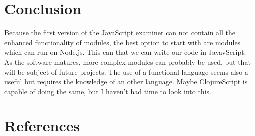\documentclass{article}
\begin{document}
\section{Conclusion}
Because the first version of the JavaScript examiner can not contain all the enhanced 
functionality of modules, the best option to start with are modules which can run on Node.js.
This can that we can write our code in JavavScript.
As the software matures, more complex modules can probably be used, but that will be subject of future projects.
The use of a functional language seems also a useful but requires the knowledge of an other language.
Maybe ClojureScript is capable of doing the same, but I haven't had time to look into this.  

\section{References}
\end{document}
